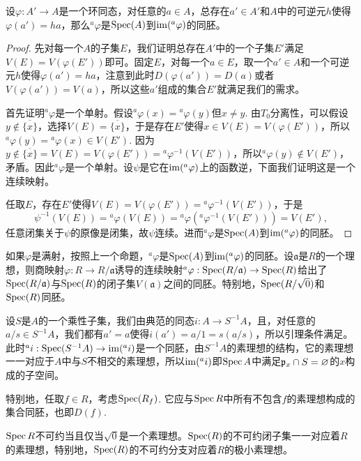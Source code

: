 \begin{lem}\label{lem:3.9}
设$\varphi:A'\to A$是一个环同态，对任意的$a\in A$，总存在$a'\in A'$和$A$中的可逆元$h$使得$\varphi(a')=ha$，那么$^a\varphi$是$\operatorname{Spec}(A)$到$\operatorname{im} (^a\varphi)$的同胚。
\end{lem}

\begin{proof} 先对每一个$A$的子集$E$，我们证明总存在$A'$中的一个子集$E'$满足$V(E)=V(\varphi(E'))$即可。固定$E$，对每一个$a\in E$，取一个$a'\in A$和一个可逆元$h$使得$\varphi(a')=ha$，注意到此时$D(\varphi(a'))=D(a)$或者$V(\varphi(a'))=V(a)$，所以这些$a'$组成的集合$E'$就满足我们的需求。

首先证明$^a\varphi$是一个单射。假设$^a\varphi(x)={}^a\varphi(y)$但$x\neq y$. 由$T_0$分离性，可以假设$y\not\in \overline{\{x\}}$，选择$V(E)=\overline{\{x\}}$，于是存在$E'$使得$x\in V(E)=V(\varphi(E'))$，所以${}^a\varphi(y)={}^a\varphi(x)\in V(E')$. 因为$y\not\in \overline{\{x\}}=V(E)=V(\varphi(E'))={}^a\varphi^{-1}(V(E'))$，所以${}^a\varphi(y)\not\in V(E')$，矛盾。因此$^a\varphi$是一个单射。设$\psi$是它在$\operatorname{im} (^a\varphi)$上的函数逆，下面我们证明这是一个连续映射。

任取$E$，存在$E'$使得$V(E)=V(\varphi(E'))={}^a\varphi^{-1}(V(E'))$，于是
\[
	\psi^{-1}(V(E))={}^a\varphi(V(E))={}^a\varphi({}^a\varphi^{-1}(V(E')))=V(E'),
\]
任意闭集关于$\psi$的原像是闭集，故$\psi$连续。进而$^a\varphi$是$\operatorname{Spec}(A)$到$\operatorname{im} (^a\varphi)$的同胚。
\end{proof}

如果$\varphi$是满射，按照上一个命题，$^a\varphi$是$\operatorname{Spec}(A)$到$\operatorname{im} (^a\varphi)$的同胚。设$\mathfrak{a}$是$R$的一个理想，则商映射$\varphi:R\to R/\mathfrak{a}$诱导的连续映射$^a\varphi:\operatorname{Spec}(R/\mathfrak{a})\to \operatorname{Spec}(R)$给出了$\operatorname{Spec}(R/\mathfrak{a})$与$\operatorname{Spec}(R)$的闭子集$V(\mathfrak{a})$之间的同胚。特别地，$\operatorname{Spec}(R/\sqrt{0})$和$\operatorname{Spec}(R)$同胚。

设$S$是$A$的一个乘性子集，我们由典范的同态$i:A\to S^{-1}A$，且，对任意的$a/s\in S^{-1}A$，我们都有$a'=a$使得$i(a')=a/1=s(a/s)$，所以引理条件满足。此时${}^ai:\operatorname{Spec}(S^{-1}A)\to \operatorname{im} ({}^ai)$是一个同胚，由$S^{-1}A$的素理想的结构，它的素理想一一对应于$A$中与$S$不相交的素理想，所以$\operatorname{im} ({}^ai)$即$\operatorname{Spec} A$中满足$\mathfrak{p}_x\cap S=\varnothing$的$x$构成的子空间。

特别地，任取$f\in R$，考虑$\operatorname{Spec}(R_f)$. 它应与$\operatorname{Spec} R$中所有不包含$f$的素理想构成的集合同胚，也即$D(f)$. 

\begin{pro}
$\operatorname{Spec} R$不可约当且仅当$\sqrt{0}$是一个素理想。$\operatorname{Spec}(R)$的不可约闭子集一一对应着$R$的素理想，特别地，$\operatorname{Spec}(R)$的不可约分支对应着$R$的极小素理想。
\end{pro}

